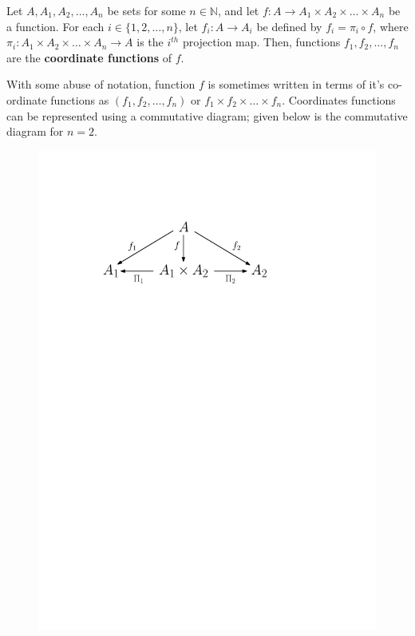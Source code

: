 \documentclass[a4paper,english,12pt]{article}
\begin{document}
\begin{defn} Let $A,A_1,A_2,\ldots,A_n$ be sets for some $n\in \mathbb{N}$, and let $f:A\rightarrow A_1\times A_2\times \ldots \times A_n$ be a function. For each $i\in \{1,2,\ldots ,n\}$, let $f_i:A\rightarrow A_i$ be defined by $f_i=\pi _i\circ f$, where $\pi _i:A_1\times A_2\times \ldots \times A_n \rightarrow A$ is the $i^{th}$ projection map. Then, functions $f_1,f_2,\ldots ,f_n$ are the \textbf{coordinate functions} of $f$.
\end{defn}
With some abuse of notation, function $f$ is sometimes written in terms of it's co-ordinate functions as $(f_1,f_2,\ldots,f_n)$ or $f_1 \times f_2 \times \ldots \times f_n$. Coordinates functions can be represented using a commutative diagram; given below is the commutative diagram for $n=2$.
\begin{figure}[h]
\centering
\includegraphics[scale=0.56]{Figures/l5f4_coord.pdf}
\end{figure}
\end{document}
